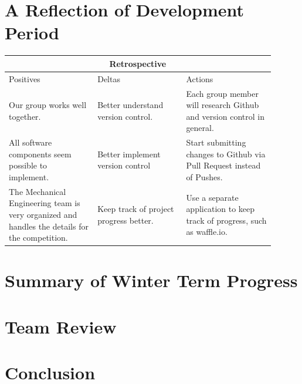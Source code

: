 \documentclass[10pt,letterpaper,onecolumn,draftclsnofoot,journal]{IEEEtran}
\begin{document}
\section{A Reflection of Development Period}
\begin{tabular}{ |p{0.3\linewidth}|p{0.3\linewidth}|p{0.3\linewidth}|  }
	\hline
	\multicolumn{3}{|c|}{Retrospective} \\
	\hline
	Positives& Deltas &Actions \\
	\hline
	Our group works well together. &
	Better understand version control.&
	Each group member will research Github and version control in general. \\
	
	All software components seem possible to implement. &
	Better implement version control &
	Start submitting changes to Github via Pull Request instead of Pushes. \\
	
	The Mechanical Engineering team is very organized and handles the details for the competition. &
	Keep track of project progress better. & Use a separate application to keep track of progress, such as waffle.io.  \\
	\hline
\end{tabular}

\section{Summary of Winter Term Progress}

\section{Team Review}

\section{Conclusion}

\clearpage

\vspace{1in}
\end{document}
